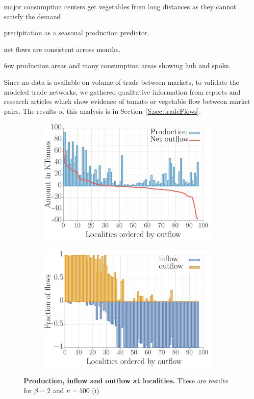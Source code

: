 \documentclass[11pt]{article}
\theoremstyle{definition}
\begin{document}
major consumption centers get vegetables from long distances as they cannot
satisfy the demand

precipitation as a seasonal production predictor.

net flows are consistent across months.

few production areas and many consumption areas showing hub and spoke.

Since no data is available on volume of trade between markets, to validate
the modeled trade networks, we gathered qualitative information from
reports and research articles which show evidence of tomato or vegetable
flow between market pairs. The results of this analysis is in
Section~\ref{S:sec:tradeFlows}.  
\begin{figure}[ht]
    \centering
\begin{subfigure}[b]{.47\textwidth}
    \includegraphics[width=\textwidth]{../long_distance/results/prod_netout_flows_precip1_b2_k500.pdf}
    \caption{\label{fig:prod_netout}}
\end{subfigure}\hspace{.5cm}
\begin{subfigure}[b]{.47\textwidth}
    \includegraphics[width=\textwidth]{../long_distance/results/monthly_in_out_flows_precip1_b2_k500.pdf}
    \caption{\label{fig:monthly_in_out}}
\end{subfigure}
\caption{\textbf{Production, inflow and outflow at localities.} These are
results for $\beta=2$ and $\kappa=500$ (i) \label{fig:tradeProps}}
\end{figure}
\end{document}

